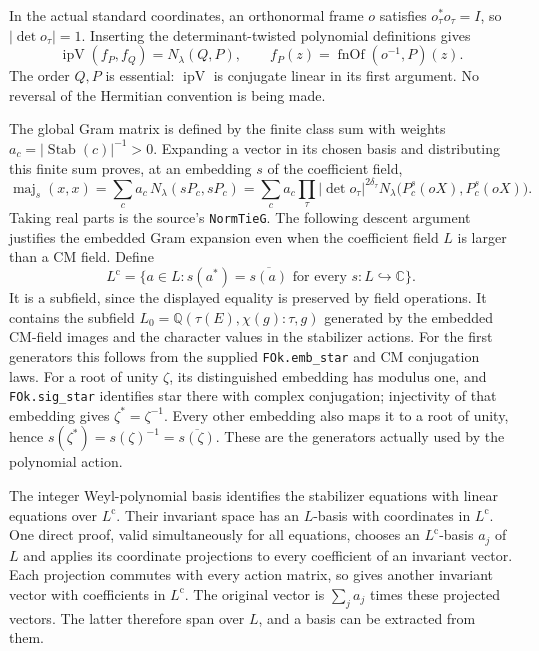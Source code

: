 \documentclass[11pt,a4paper]{article}
\numberwithin{equation}{section}
\theoremstyle{remark}\newtheorem{remark}[theorem]{Remark}
\begin{document}
In the actual standard coordinates, an orthonormal frame $o$ satisfies
$o_\tau^*o_\tau=I$, so $|\det o_\tau|=1$. Inserting the
determinant-twisted polynomial definitions gives
\[
 \operatorname{ipV}(f_P,f_Q)=N_\lambda(Q,P),
 \qquad f_P(z)=\operatorname{fnOf}(o^{-1},P)(z).
 \tag{FC.16}
\]
The order $Q,P$ is essential: $\operatorname{ipV}$ is conjugate linear
in its first argument. No reversal of the Hermitian convention is
being made.

The global Gram matrix is defined by the finite class sum with weights
$a_c=|\operatorname{Stab}(c)|^{-1}>0$. Expanding a vector in its
chosen basis and distributing this finite sum proves, at an embedding
$s$ of the coefficient field,
\[
 \operatorname{maj}_s(x,x)
   =\sum_c a_c\,N_\lambda(sP_c,sP_c)
   =\sum_c a_c\prod_\tau|\det o_\tau|^{2\delta_\tau}
       N_\lambda\bigl(P_c^s(oX),P_c^s(oX)\bigr).
 \tag{FC.17}
\]
Taking real parts is the source's \texttt{NormTieG}. The following
descent argument justifies the embedded Gram expansion even when the
coefficient field $L$ is larger than a CM field. Define
\[
 L^{\mathrm c}=\{a\in L:
    s(a^*)=\overline{s(a)}\text{ for every }s:L\hookrightarrow\mathbb C\}.
 \tag{FC.17a}
\]
It is a subfield, since the displayed equality is preserved by field
operations. It contains the subfield
$L_0=\mathbb Q(\tau(E),\chi(g):\tau,g)$ generated by the embedded
CM-field images and the character values in the stabilizer actions.
For the first generators this follows from the supplied
\texttt{FOk.emb\_\allowbreak star} and CM conjugation laws. For a root of unity
$\zeta$, its distinguished embedding has modulus one, and
\texttt{FOk.sig\_\allowbreak star} identifies star there with complex conjugation;
injectivity
of that embedding gives $\zeta^*=\zeta^{-1}$. Every other embedding
also maps it to a root of unity, hence
$s(\zeta^*)=s(\zeta)^{-1}=\overline{s(\zeta)}$.
These are the generators actually used by the polynomial action.

The integer Weyl-polynomial basis identifies the stabilizer equations
with linear equations over $L^{\mathrm c}$. Their invariant space has
an $L$-basis with coordinates in $L^{\mathrm c}$. One direct proof,
valid simultaneously for all equations, chooses an
$L^{\mathrm c}$-basis $a_j$ of $L$ and applies its coordinate
projections to every coefficient of an invariant vector. Each projection
commutes with every action matrix, so gives another invariant vector
with coefficients in $L^{\mathrm c}$. The original vector is
$\sum_j a_j$ times these projected vectors. The latter therefore span
over $L$, and a basis can be extracted from them.
\end{document}
